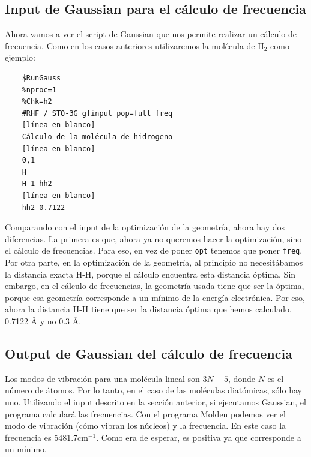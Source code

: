 \documentclass{tufte-book}
\begin{document}
\subsection{Input de Gaussian para el cálculo de frecuencia}
Ahora vamos a ver el script de Gaussian que nos permite
realizar un cálculo de frecuencia. Como en los casos
anteriores utilizaremos la molécula de H$_2$ como ejemplo:
\begin{verbatim}
    $RunGauss
    %nproc=1
    %Chk=h2
    #RHF / STO-3G gfinput pop=full freq
    [línea en blanco]
    Cálculo de la molécula de hidrogeno 
    [línea en blanco] 
    0,1
    H
    H 1 hh2
    [línea en blanco]
    hh2 0.7122
\end{verbatim}

Comparando con el input de la optimización de la geometría,
ahora hay dos diferencias. La primera es que, ahora ya no
queremos hacer la optimización, sino el cálculo de 
frecuencias. Para eso, en vez de poner \texttt{opt} tenemos
que poner \texttt{freq}. Por otra parte, en la optimización
de la geometría, al principio no necesitábamos la distancia
exacta H-H, porque el cálculo encuentra esta distancia
óptima. Sin embargo, en el cálculo de frecuencias, la
geometría usada tiene que ser la óptima, porque esa
geometría corresponde a un mínimo de la energía electrónica.
Por eso, ahora la distancia H-H tiene que ser la distancia 
óptima que hemos calculado, 0.7122 {\AA} y no 0.3 \AA.

\subsection{Output de Gaussian del cálculo de frecuencia}
Los modos de vibración para una molécula lineal son $3N-5$, 
donde $N$ es el número de átomos.
Por lo tanto, en el caso de  las moléculas diatómicas, sólo
hay uno. Utilizando el input descrito en la sección
anterior, si ejecutamos Gaussian, el programa calculará las
frecuencias. Con el programa Molden podemos ver el modo de
vibración (cómo vibran los núcleos) y la frecuencia. 
En este caso la frecuencia es 5481.7cm$^{-1}$. Como era de
esperar, es positiva ya que corresponde a un mínimo.
\end{document}
